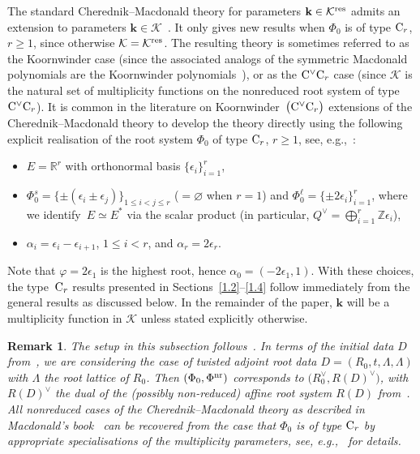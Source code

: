 \documentclass[pdftex]{sigma}
\numberwithin{equation}{section}
\newtheorem{Remark}[Theorem]{Remark} }
\begin{document}
The standard Cherednik--Macdonald theory for parameters $\mathbf{k}\in\mathcal{K}^{{\rm res}}$ admits an extension to
parameters $\mathbf{k}\in\mathcal{K}$~\cite{No,Sa}. It only gives new results when $\Phi_0$ is of type ${\rm C}_r$, $r\geq 1$, since otherwise $\mathcal{K}=\mathcal{K}^{{\rm res}}$.
The resulting theory is sometimes referred to as the Koornwinder case \big(since the associated analogs of the symmetric Macdonald polynomials are the Koornwinder polynomials~\cite{Ko}\big), or as the ${\rm C}^\vee{\rm C}_r$ case (since $\mathcal{K}$ is the natural set of multiplicity functions on the nonreduced root system of type
${\rm C}^\vee{\rm C}_r$).
It is common in the literature on Koornwinder~$\big({\rm C}^\vee{\rm C}_r\big)$ extensions of the Cherednik--Macdonald theory
to develop the theory directly using the following explicit realisation of the root system $\Phi_0$ of type ${\rm C}_r$, $r\geq 1$, see, e.g.,~\cite{Ko,No,Sa,St}:
\begin{itemize}\itemsep=0pt
\item $E=\mathbb{R}^r$ with orthonormal basis $\{\epsilon_i\}_{i=1}^r$,
\item $\Phi_0^s=\{\pm(\epsilon_i\pm\epsilon_j)\}_{1\leq i<j\leq r}$ ($=\varnothing$ when $r=1$) and $\Phi_0^\ell=\{\pm 2\epsilon_i\}_{i=1}^r$, where we identify~${E\simeq E^*}$
via the scalar product \big(in particular, $Q^\vee=\bigoplus_{i=1}^r\mathbb{Z}\epsilon_i$\big),
\item $\alpha_i=\epsilon_i-\epsilon_{i+1}$, $1\leq i<r$, and $\alpha_r=2\epsilon_r$.
\end{itemize}
Note that
$\varphi=2\epsilon_1$ is the highest root, hence $\alpha_0=(-2\epsilon_1,1)$. With these choices, the type~${\rm C}_r$ results presented in Sections~\ref{1.2}--\ref{1.4} follow immediately from the general results as discussed below. In the remainder of the paper, $\mathbf{k}$ will be a multiplicity function in $\mathcal{K}$ unless stated explicitly otherwise.

\begin{Remark}
The setup in this subsection follows~\cite{StAM, StCh}. In terms of the initial data $D$ from~\cite[Section~1.1]{StAM}, we are considering the case of twisted adjoint root data $D=(R_0,t,\Lambda,\Lambda)$ with $\Lambda$ the root lattice of $R_0$. Then
$(\Phi_0,\Phi^{\textup{nr}})$ corresponds to $\bigl(R_0^\vee,R(D)^\vee\bigr)$, with $R(D)^\vee$ the dual of the (possibly non-reduced) affine root system $R(D)$ from~\cite[Section~1.1]{StAM}. All nonreduced cases of the Cherednik--Macdonald theory as described in Macdonald's book~\cite{Ma} can be recovered from the case that $\Phi_0$ is of type ${\rm C}_r$ by appropriate specialisations of the multiplicity parameters, see, e.g.,~\cite[Section~9.2.3]{StCh} for details.
\end{Remark}
\end{document}
